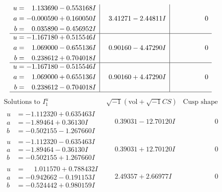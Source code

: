 \documentclass[1p]{elsarticle_modified}
\theoremstyle{definition}
\newcommand{\I}{\sqrt{-1}}
\begin{document}
$$\begin{array}{c|c|c}
\begin{aligned}
u &= \phantom{-}1.133690 - 0.553168 I \\
a &= -0.000590 + 0.160050 I \\
b &= \phantom{-}0.035890 - 0.456952 I\end{aligned}
 & \phantom{-}3.41271 - 2.44811 I & \phantom{-0.000000 } 0 \\ \hline\begin{aligned}
u &= -1.167180 + 0.515546 I \\
a &= \phantom{-}1.069000 - 0.655136 I \\
b &= \phantom{-}0.238612 + 0.704018 I\end{aligned}
 & \phantom{-}0.90160 - 4.47290 I & \phantom{-0.000000 } 0 \\ \hline\begin{aligned}
u &= -1.167180 - 0.515546 I \\
a &= \phantom{-}1.069000 + 0.655136 I \\
b &= \phantom{-}0.238612 - 0.704018 I\end{aligned}
 & \phantom{-}0.90160 + 4.47290 I & \phantom{-0.000000 } 0\\
 \hline 
 \end{array}$$\newpage$$\begin{array}{c|c|c}  
\text{Solutions to }I^u_{1}& \I (\text{vol} + \sqrt{-1}CS) & \text{Cusp shape}\\
 \hline 
\begin{aligned}
u &= -1.112320 + 0.635463 I \\
a &= -1.89464 + 0.36130 I \\
b &= -0.502155 - 1.267660 I\end{aligned}
 & \phantom{-}0.39031 - 12.70120 I & \phantom{-0.000000 } 0 \\ \hline\begin{aligned}
u &= -1.112320 - 0.635463 I \\
a &= -1.89464 - 0.36130 I \\
b &= -0.502155 + 1.267660 I\end{aligned}
 & \phantom{-}0.39031 + 12.70120 I & \phantom{-0.000000 } 0 \\ \hline\begin{aligned}
u &= \phantom{-}1.011570 + 0.788432 I \\
a &= -0.942662 - 0.191153 I \\
b &= -0.524442 + 0.980159 I\end{aligned}
 & \phantom{-}2.49357 + 2.66977 I & \phantom{-0.000000 } 0 \\ \hline\begin{aligned}

\end{aligned}
\end{array}$$
\end{document}
